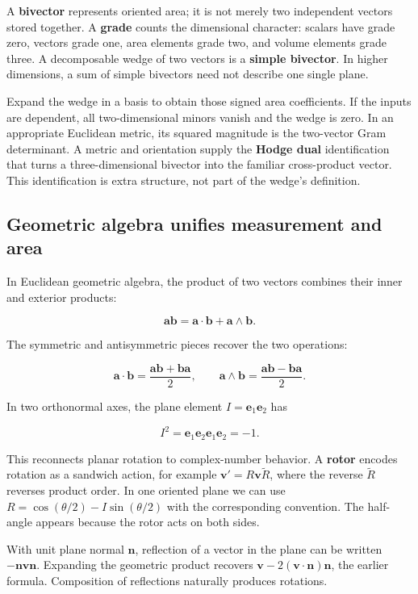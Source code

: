 A \textbf{bivector} represents oriented area; it is not merely two independent vectors stored together. A \textbf{grade} counts the dimensional character: scalars have grade zero, vectors grade one, area elements grade two, and volume elements grade three. A decomposable wedge of two vectors is a \textbf{simple bivector}. In higher dimensions, a sum of simple bivectors need not describe one single plane.

Expand the wedge in a basis to obtain those signed area coefficients. If the inputs are dependent, all two-dimensional minors vanish and the wedge is zero. In an appropriate Euclidean metric, its squared magnitude is the two-vector Gram determinant. A metric and orientation supply the \textbf{Hodge dual} identification that turns a three-dimensional bivector into the familiar cross-product vector. This identification is extra structure, not part of the wedge's definition.

\subsection{Geometric algebra unifies measurement and area}\label{01-foundations-i-ch018-geometric-algebra-unifies-measurement-and-area}

In Euclidean geometric algebra, the product of two vectors combines their inner and exterior products:

\[
\mathbf a\mathbf b=\mathbf a\cdot\mathbf b+\mathbf a\wedge\mathbf b.
\]

The symmetric and antisymmetric pieces recover the two operations:

\[
\mathbf a\cdot\mathbf b=\frac{\mathbf a\mathbf b+\mathbf b\mathbf a}{2},\qquad
\mathbf a\wedge\mathbf b=\frac{\mathbf a\mathbf b-\mathbf b\mathbf a}{2}.
\]

In two orthonormal axes, the plane element \(I=\mathbf e_1\mathbf e_2\) has

\[
I^2=\mathbf e_1\mathbf e_2\mathbf e_1\mathbf e_2=-1.
\]

This reconnects planar rotation to complex-number behavior. A \textbf{rotor} encodes rotation as a sandwich action, for example \(\mathbf v'=R\mathbf v\widetilde R\), where the reverse \(\widetilde R\) reverses product order. In one oriented plane we can use \(R=\cos(\theta/2)-I\sin(\theta/2)\) with the corresponding convention. The half-angle appears because the rotor acts on both sides.

With unit plane normal \(\mathbf n\), reflection of a vector in the plane can be written \(-\mathbf n\mathbf v\mathbf n\). Expanding the geometric product recovers \(\mathbf v-2(\mathbf v\cdot\mathbf n)\mathbf n\), the earlier formula. Composition of reflections naturally produces rotations.

